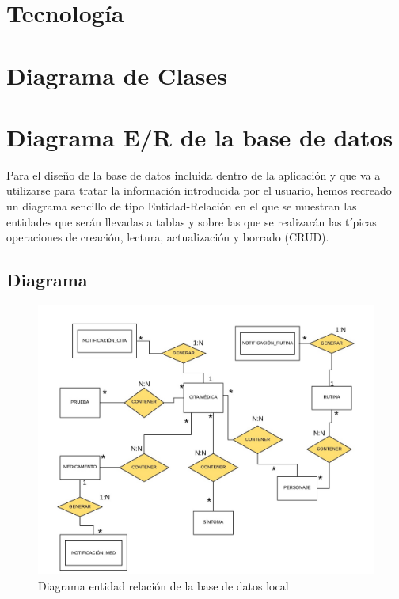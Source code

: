 \documentclass[../pfc.tex]{subfiles}
\begin{document}
	
	\section{Tecnología}
	
	\section{Diagrama de Clases}
	
	\section{Diagrama E/R de la base de datos}
	
	Para el diseño de la base de datos incluida dentro de la aplicación y que va a utilizarse para tratar la información introducida por el usuario, hemos recreado un diagrama sencillo de tipo Entidad-Relación en el que se muestran las entidades que serán llevadas a tablas y sobre las que se realizarán las típicas operaciones de creación, lectura, actualización y borrado (CRUD).
	
		\subsection{Diagrama}
		
		\begin{figure}[H]
			\centering
			\includegraphics[width=1\linewidth]{../images/diagrama_e_r}
			\caption{Diagrama entidad relación de la base de datos local}
			\label{fig:diagramaer}
		\end{figure}
		
\end{document}
